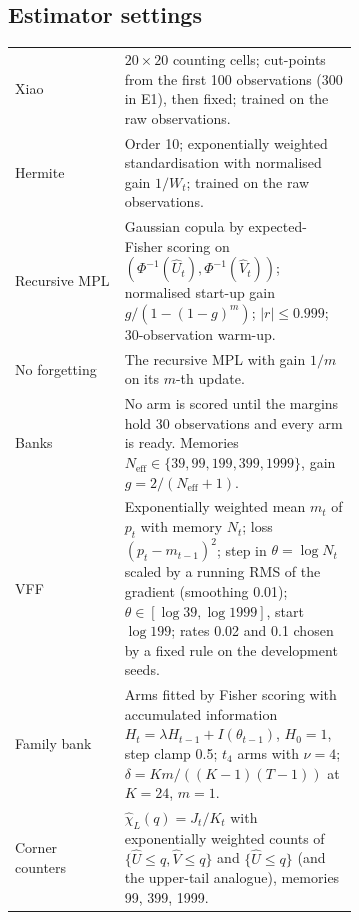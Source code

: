 \subsection{Estimator settings}
\begin{center}\small
\begin{tabular}{@{}lp{0.68\linewidth}@{}}
\toprule
Xiao & $20\times20$ counting cells; cut-points from the first 100 observations (300 in E1), then fixed; trained on the raw observations. \\
Hermite & Order 10; exponentially weighted standardisation with normalised gain $1/W_t$; trained on the raw observations. \\
Recursive MPL & Gaussian copula by expected-Fisher scoring on $(\Phi^{-1}(\widehat U_t), \Phi^{-1}(\widehat V_t))$; normalised start-up gain $g/(1-(1-g)^m)$; $|r|\le0.999$; 30-observation warm-up. \\
No forgetting & The recursive MPL with gain $1/m$ on its $m$-th update. \\
Banks & No arm is scored until the margins hold 30 observations and every arm is ready. Memories $N_{\mathrm{eff}}\in\{39,99,199,399,1999\}$, gain $g = 2/(N_{\mathrm{eff}}+1)$. \\
VFF & Exponentially weighted mean $m_t$ of $p_t$ with memory $N_t$; loss $(p_t - m_{t-1})^2$; step in $\theta = \log N_t$ scaled by a running RMS of the gradient (smoothing 0.01); $\theta\in[\log 39, \log 1999]$, start $\log 199$; rates 0.02 and 0.1 chosen by a fixed rule on the development seeds. \\
Family bank & Arms fitted by Fisher scoring with accumulated information $H_t = \lambda H_{t-1} + I(\theta_{t-1})$, $H_0 = 1$, step clamp 0.5; $t_4$ arms with $\nu = 4$; $\delta = K m/((K-1)(T-1))$ at $K = 24$, $m = 1$. \\
Corner counters & $\widehat\chi_L(q) = J_t/K_t$ with exponentially weighted counts of $\{\widehat U\le q, \widehat V\le q\}$ and $\{\widehat U\le q\}$ (and the upper-tail analogue), memories 99, 399, 1999. \\
\bottomrule
\end{tabular}
\end{center}


